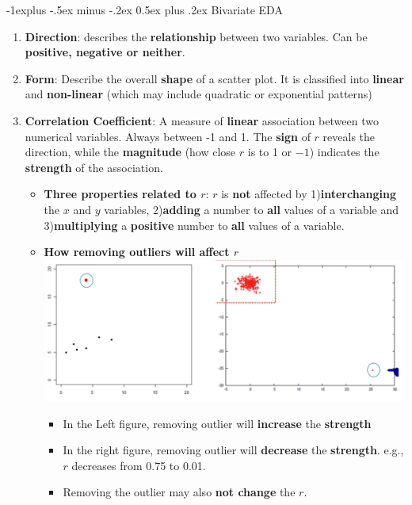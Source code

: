 \documentclass[10pt, landscape]{article}
\makeatletter
\renewcommand{\subsection}{\@startsection{subsection}{2}{0mm}%
                                {-1explus -.5ex minus -.2ex}%
                                {0.5ex plus .2ex}%
                                {\normalfont\normalsize\bfseries}}
\makeatother
\begin{document}
\begin{multicols}{4}
\subsection{Bivariate EDA}
\begin{enumerate}
    \item \textbf{Direction}: describes the \textbf{relationship} between two variables. Can be \textbf{positive, negative or neither}.
    \item \textbf{Form}: Describe the overall \textbf{shape} of a scatter plot. It is classified into \textbf{linear} and \textbf{non-linear} (which may include quadratic or exponential patterns)
    \item \textbf{Correlation Coefficient}: A measure of \textbf{linear} association between two numerical variables. Always between -1 and 1. The \textbf{sign} of \(r\) reveals the direction, while the \textbf{magnitude} (how close \(r\) is to 1 or \(-1\)) indicates the \textbf{strength} of the association.
    \begin{itemize}
        \item \textbf{Three properties related to $r$}: $r$ is \textbf{not} affected by 1)\textbf{interchanging} the $x$ and $y$ variables, 2)\textbf{adding} a number to \textbf{all} values of a variable and 3)\textbf{multiplying} a \textbf{positive} number to \textbf{all} values of a variable.
        \item \textbf{How removing outliers will affect $r$} \\
        \includegraphics[width=1\linewidth]{images/9.png}
        \begin{itemize}
            \item In the Left figure, removing outlier will \textbf{increase} the \textbf{strength}
            \item In the right figure, removing outlier will \textbf{decrease} the \textbf{strength}. e.g., $r$ decreases from 0.75 to 0.01.
            \item Removing the outlier may also \textbf{not change} the $r$.

\end{itemize}
\end{itemize}
\end{enumerate}
\end{multicols}
\end{document}
